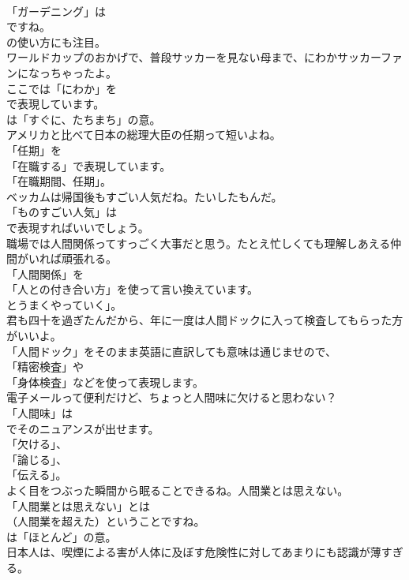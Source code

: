 \documentclass[8pt]{extreport}
\begin{document}
\begin{CJK}{UTF8}{min}
\\	「ガーデニング」は 
\\	ですね。
\\	の使い方にも注目。	
\\	ワールドカップのおかげで、普段サッカーを見ない母まで、にわかサッカーファンになっちゃったよ。 
\\	ここでは「にわか」を 
\\	で表現しています。
\\	は「すぐに、たちまち」の意。	
\\	アメリカと比べて日本の総理大臣の任期って短いよね。 
\\	「任期」を
\\	「在職する」で表現しています。
\\	「在職期間、任期」。	
\\	ベッカムは帰国後もすごい人気だね。たいしたもんだ。 
\\	「ものすごい人気」は 
\\	で表現すればいいでしょう。	
\\	職場では人間関係ってすっごく大事だと思う。たとえ忙しくても理解しあえる仲間がいれば頑張れる。 
\\	「人間関係」を
\\	「人との付き合い方」を使って言い換えています。
\\	とうまくやっていく」。	
\\	君も四十を過ぎたんだから、年に一度は人間ドックに入って検査してもらった方がいいよ。 
\\	「人間ドック」をそのまま英語に直訳しても意味は通じませので、
\\	「精密検査」や
\\	「身体検査」などを使って表現します。	
\\	電子メールって便利だけど、ちょっと人間味に欠けると思わない？ 
\\	「人間味」は
\\	でそのニュアンスが出せます。
\\	「欠ける」、
\\	「論じる」、
\\	「伝える」。	
\\	よく目をつぶった瞬間から眠ることできるね。人間業とは思えない。 
\\	「人間業とは思えない」とは 
\\	（人間業を超えた）ということですね。
\\	は「ほとんど」の意。	
\\	日本人は、喫煙による害が人体に及ぼす危険性に対してあまりにも認識が薄すぎる。 

\end{CJK}
\end{document}
